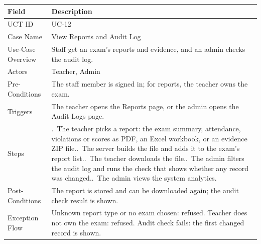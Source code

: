 \begin{lrbox}{\uctbox}{\small\renewcommand{\arraystretch}{1.1}\setlength{\tabcolsep}{6pt}%
\begin{tabular}{>{\raggedright\arraybackslash}p{3.6cm}>{\raggedright\arraybackslash}p{\dimexpr\textwidth-3.6cm-4\tabcolsep\relax}}
\hline\hline
\textbf{Field} & \textbf{Description} \\ \hline
UCT ID & UC-12 \\
Case Name & View Reports and Audit Log \\
Use-Case Overview & Staff get an exam's reports and evidence, and an admin checks the audit log. \\
Actors & Teacher, Admin \\
Pre-Conditions & The staff member is signed in; for reports, the teacher owns the exam. \\
Triggers & The teacher opens the Reports page, or the admin opens the Audit Logs page. \\
Steps & 1.~The teacher picks a report: the exam summary, attendance, violations or scores as PDF, an Excel workbook, or an evidence ZIP file.\newline
2.~The server builds the file and adds it to the exam's report list.\newline
3.~The teacher downloads the file.\newline
4.~The admin filters the audit log and runs the check that shows whether any record was changed.\newline
5.~The admin views the system analytics. \\
Post-Conditions & The report is stored and can be downloaded again; the audit check result is shown. \\
Exception Flow & Unknown report type or no exam chosen: refused. Teacher does not own the exam: refused. Audit check fails: the first changed record is shown. \\
\hline\hline
\end{tabular}}\end{lrbox}
\begin{table}[H]
\centering
\caption{Use Case Table for View Reports and Audit Log}\label{tab:uc12}
\vspace{4pt}
\usebox{\uctbox}
\end{table}
